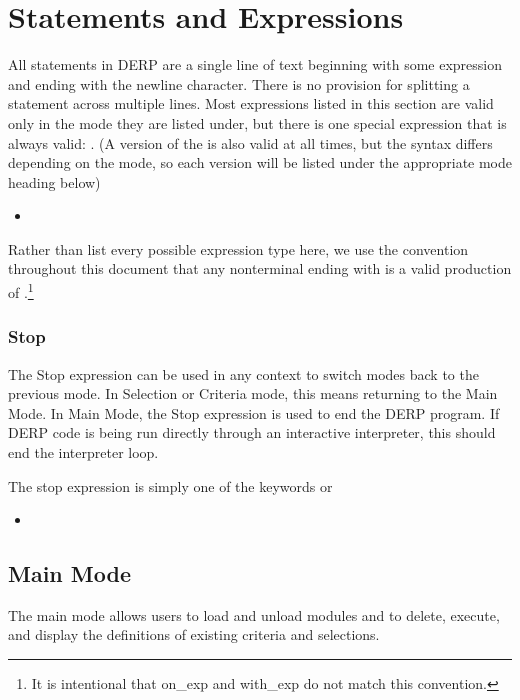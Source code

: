 \section{Statements and Expressions}
All statements in DERP are a single line of text beginning with some expression
and ending with the newline character. There is no provision for splitting a
statement across multiple lines. Most expressions listed in this section are
valid only in the mode they are listed under, but there is one special expression
that is always valid: . (A version of the 
is also valid at all times, but the syntax differs depending on the mode, so each version
will be listed under the appropriate mode heading below)
\begin{itemize}[leftmargin=2in]
    \item[\nonterminal{statement}] \bnf{:}  
\end{itemize}


Rather than list every possible expression type here, we use the convention throughout
this document that any nonterminal ending with  is a valid production of
.\footnote{It is intentional that on\_exp and with\_exp do not match this convention.}

\subsubsection{Stop}
The Stop expression can be used in any context to switch modes back to the previous mode. In Selection
or Criteria mode, this means returning to the Main Mode. In Main Mode, the Stop expression is used to
end the DERP program. If DERP code is being run directly through an interactive interpreter, this should
end the interpreter loop.

The stop expression is simply one of the keywords  or 
\begin{itemize}[leftmargin=2in]
    \item[\nonterminal{stop\_expression}] \bnf{:}  \bnf{|} 
\end{itemize}

\subsection{Main Mode}\label{mainmode}
The main mode allows users to load and unload modules and to delete, execute, and display the definitions
of existing criteria and selections.

